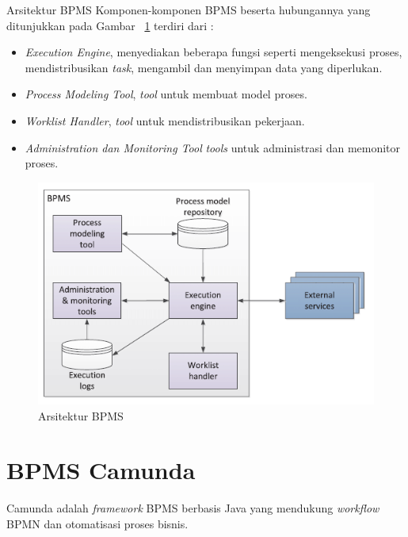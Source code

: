 Arsitektur BPMS
Komponen-komponen BPMS beserta hubungannya yang ditunjukkan pada Gambar ~\ref{fig:arsitekturbpms} terdiri dari :
\begin{itemize}
	\item \textit{Execution Engine}, menyediakan beberapa fungsi seperti mengeksekusi proses, mendistribusikan \textit{task}, mengambil dan menyimpan data yang diperlukan. 
	\item \textit{Process Modeling Tool}, \textit{tool} untuk membuat model proses.
	\item \textit{Worklist Handler}, \textit{tool} untuk mendistribusikan pekerjaan.
	\item \textit{Administration dan Monitoring Tool} \textit{tools} untuk administrasi dan memonitor proses. 
\end{itemize}
\begin{figure}[H]
	\centering
	\includegraphics[scale=0.7]{Gambar/Bab-2/bpms/bpms}
	\caption{Arsitektur BPMS} 
	\label{fig:arsitekturbpms}
\end{figure}



\section{BPMS Camunda}
\label{bpmscamunda}
Camunda adalah \textit{framework} BPMS berbasis Java yang mendukung \textit{workflow} BPMN dan otomatisasi proses bisnis\cite{bpmmanual:15:7.6}. 

